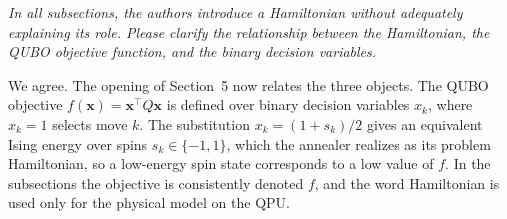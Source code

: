 \documentclass[12pt]{article}
\newenvironment{rc}[1]{\par\medskip\noindent\itshape\renewcommand{\emph}[1]{\textbf{##1}}\ignorespaces}{\par}
\newcommand{\answer}[1]{\par\smallskip\noindent #1\par}
\begin{document}
\begin{rc}{R2 3 --- Hamiltonian formulation}
In all subsections, the authors introduce a Hamiltonian without adequately explaining its role. Please clarify the relationship between the Hamiltonian, the QUBO objective function, and the binary decision variables.
\end{rc}
\answer{We agree. The opening of Section~5 now relates the three objects. The QUBO objective $f(\mathbf{x})=\mathbf{x}^\top Q\mathbf{x}$ is defined over binary decision variables $x_k$, where $x_k=1$ selects move $k$. The substitution $x_k=(1+s_k)/2$ gives an equivalent Ising energy over spins $s_k\in\{-1,1\}$, which the annealer realizes as its problem Hamiltonian, so a low-energy spin state corresponds to a low value of $f$. In the subsections the objective is consistently denoted $f$, and the word Hamiltonian is used only for the physical model on the QPU.}
\end{document}

